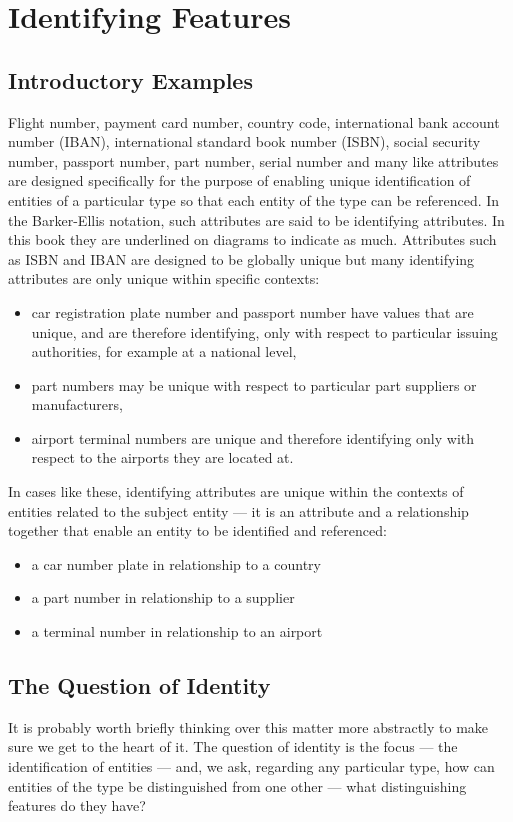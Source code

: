 \section{Identifying Features}
\label{IdentifyingFeatures}

\subsection{Introductory Examples}

\mynote
Flight number, payment card number, country code, international bank account number (IBAN), 
international standard book number (ISBN), social security number, passport number, part number, serial number and many like attributes are designed specifically for the purpose of enabling unique identification of entities of a particular type so that each entity of the type can be referenced. 
In the Barker-Ellis notation, such attributes are said to be identifying attributes. In this book they are underlined 
on diagrams to indicate as much. 
Attributes such as ISBN and IBAN are designed to be globally unique but many identifying attributes are only unique within specific contexts:
\begin{itemize}
\item
car registration plate number and passport number have values that are unique, and are therefore identifying, only with respect to particular issuing authorities, for example at a national level,
\item part numbers may be unique with respect to particular part suppliers or manufacturers,
\item airport terminal numbers are unique and therefore identifying only with respect to the airports they are located at.
\end{itemize}
In cases like these, identifying attributes are unique within the contexts of entities related to the subject entity --- it is an attribute and a relationship together that enable an entity to be identified and referenced:
\begin{itemize} [label=---]
\item a car number plate in relationship to a country
\item a part number in relationship to a supplier
\item a terminal number in relationship to an airport
\end{itemize}

\subsection{The Question of Identity}
\mynote
It is probably worth briefly thinking over this matter more abstractly to make sure we get to the heart of it. The question of identity is the focus --- the identification of entities ---  and, we ask, regarding any particular type, how can entities of the type be distinguished from one other 
--- what distinguishing features do they have? 

